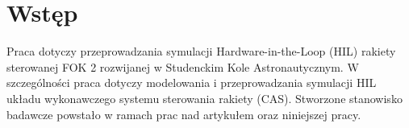 \section{Wstęp}
\label{sec:wstep}
Praca dotyczy przeprowadzania symulacji Hardware-in-the-Loop (HIL) rakiety sterowanej FOK 2
rozwijanej w Studenckim Kole Astronautycznym. W szczególności praca dotyczy modelowania
i przeprowadzania symulacji HIL układu wykonawczego systemu sterowania rakiety (CAS).
Stworzone stanowisko badawcze powstało w ramach prac nad artykułem \cite{ESAPAC2026_HIL} oraz niniejszej pracy.


